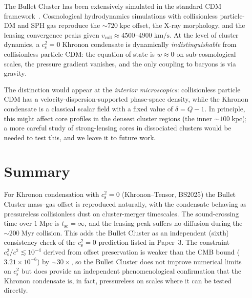 \documentclass[prd,twocolumn,superscriptaddress,longbibliography,floatfix]{revtex4-2}
\newcommand{\cs}{c_{\mathrm{s}}}
\begin{document}
The Bullet Cluster has been extensively simulated in
the standard CDM
framework~\cite{Springel2007,Mastropietro2008,Lage2014}.
Cosmological hydrodynamics simulations with
collisionless particle-DM and SPH gas reproduce the
$\sim 720\;\mathrm{kpc}$ offset, the X-ray
morphology, and the lensing convergence peaks given
$v_{\mathrm{coll}} \approx 4500\text{--}4900\;\mathrm{km/s}$.
At the level of cluster dynamics, a
$\cs^{2} = 0$ Khronon condensate is dynamically
\emph{indistinguishable} from collisionless particle
CDM: the equation of state is $w \approx 0$ on
sub-cosmological scales, the pressure gradient
vanishes, and the only coupling to baryons is via
gravity.

The distinction would appear at the
\emph{interior microscopics}: collisionless particle
CDM has a velocity-dispersion-supported phase-space
density, while the Khronon condensate is a
classical scalar field with a fixed value of
$\delta = Q-1$.  In principle, this might affect
core profiles in the densest cluster regions
(the inner $\sim 100\;\mathrm{kpc}$); a more careful
study of strong-lensing cores in
dissociated clusters would be needed to test this,
and we leave it to future work.

\section{Summary}
\label{sec:summary}

For Khronon condensation with $\cs^{2} = 0$
(Khronon--Tensor, BS2025) the Bullet Cluster
mass--gas offset is reproduced naturally, with the
condensate behaving as pressureless collisionless
dust on cluster-merger timescales.  The sound-crossing
time over $1\;\mathrm{Mpc}$ is $t_{\mathrm{sc}} = \infty$,
and the lensing peak suffers no diffusion during the
$\sim 200\;\mathrm{Myr}$ collision.  This adds the
Bullet Cluster as an independent (sixth) consistency
check of the $\cs^{2} = 0$ prediction listed in
Paper~3.  The constraint
$\cs^{2}/c^{2} \lesssim 10^{-4}$ derived from
offset preservation is weaker than the CMB bound
($3.21 \times 10^{-6}$) by $\sim 30\times$, so the
Bullet Cluster does not improve numerical limits on
$\cs^{2}$ but does provide an independent
phenomenological confirmation that the Khronon
condensate is, in fact, pressureless on scales
where it can be tested directly.
\end{document}

